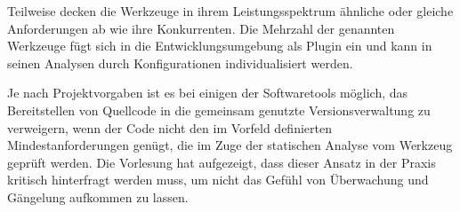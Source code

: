 Teilweise decken die Werkzeuge in ihrem Leistungsspektrum ähnliche oder gleiche Anforderungen ab wie ihre Konkurrenten. Die Mehrzahl der genannten Werkzeuge fügt sich in die Entwicklungsumgebung als Plugin ein und kann in seinen Analysen durch Konfigurationen individualisiert werden.

Je nach Projektvorgaben ist es bei einigen der Softwaretools möglich, das Bereitstellen von Quellcode in die gemeinsam genutzte Versionsverwaltung zu verweigern, wenn der Code nicht den im Vorfeld definierten Mindestanforderungen genügt, die im Zuge der statischen Analyse vom Werkzeug geprüft werden. Die Vorlesung hat aufgezeigt, dass dieser Ansatz in der Praxis kritisch hinterfragt werden muss, um nicht das Gefühl von Überwachung und Gängelung aufkommen zu lassen.

